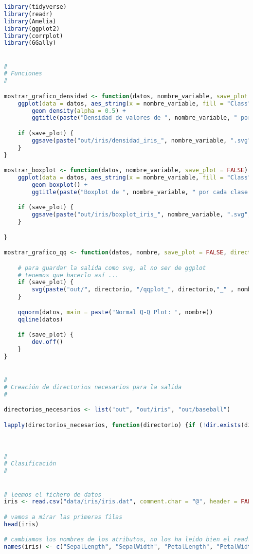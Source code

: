 \begin{lstlisting}[language=R]
library(tidyverse)
library(readr)
library(Amelia)
library(ggplot2)
library(corrplot)
library(GGally)


#
# Funciones
#

mostrar_grafico_densidad <- function(datos, nombre_variable, save_plot = FALSE) {
	ggplot(data = datos, aes_string(x = nombre_variable, fill = "Class")) +
		geom_density(alpha = 0.5) +
		ggtitle(paste("Densidad de valores de ", nombre_variable, " por cada clase."))

	if (save_plot) {
		ggsave(paste("out/iris/densidad_iris_", nombre_variable, ".svg", sep = ""), device = svg, width = 1920, height = 1080, units = "px", dpi = 150)
	}
}

mostrar_boxplot <- function(datos, nombre_variable, save_plot = FALSE) {
	ggplot(data = datos, aes_string(x = nombre_variable, fill = "Class")) +
		geom_boxplot() +
		ggtitle(paste("Boxplot de ", nombre_variable, " por cada clase."))

	if (save_plot) {
		ggsave(paste("out/iris/boxplot_iris_", nombre_variable, ".svg", sep = ""), device = svg, width = 1920, height = 1080, units = "px", dpi = 150)
	}

}

mostrar_grafico_qq <- function(datos, nombre, save_plot = FALSE, directorio = "iris") {

	# para guardar la salida como svg, al no ser de ggplot
	# tenemos que hacerlo así ...
	if (save_plot) {
		svg(paste("out/", directorio, "/qqplot_", directorio,"_" , nombre, ".svg", sep = ""))
	}

	qqnorm(datos, main = paste("Normal Q-Q Plot: ", nombre))
	qqline(datos)

	if (save_plot) {
		dev.off()
	}
}


#
# Creación de directorios necesarios para la salida
#

directorios_necesarios <- list("out", "out/iris", "out/baseball")

lapply(directorios_necesarios, function(directorio) {if (!dir.exists(directorio)) dir.create(directorio) })



#
# Clasificación
#


# leemos el fichero de datos
iris <- read.csv("data/iris/iris.dat", comment.char = "@", header = FALSE)

# vamos a mirar las primeras filas
head(iris)

# cambiamos los nombres de los atributos, no los ha leido bien el read.csv
names(iris) <- c("SepalLength", "SepalWidth", "PetalLength", "PetalWidth", "Class")


\end{lstlisting}
